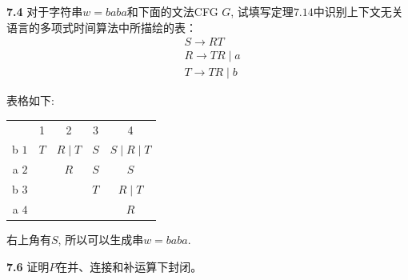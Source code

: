\documentclass[UTF8]{report}
\newcommand{\problem}[1]{{\setlength{\parskip}{10pt}\noindent \bf{#1}}}
\newenvironment{solution}{{\noindent\hskip 2em \bf 解 \quad}}{}
\begin{document}
\problem{7.4} 对于字符串$w=baba $和下面的文法CFG $G$, 试填写定理$7.14$中识别上下文无关语言的多项式时间算法中所描绘的表：
\begin{align*}
    &S \to RT        \\
    &R \to TR \mid a \\
    &T \to TR \mid b
\end{align*}

\begin{solution}
    表格如下:
    \begin{table}[htbp]
        \centering
        \begin{tabular}{r|c|c|c|c|}
        \multicolumn{1}{r}{} & \multicolumn{1}{c}{1} & \multicolumn{1}{c}{2} & \multicolumn{1}{c}{3} & \multicolumn{1}{c}{4} \bigstrut[b]\\
        \cline{2-5} b $1$ & $T$ & $R\mid T$ & $S$ & $S\mid R\mid T$ \bigstrut\\
        \cline{2-5} a $2$ &     & $R$     & $S$   & $S$ \bigstrut\\
        \cline{2-5} b $3$ &     &         & $T$   & $R\mid T$ \bigstrut\\
        \cline{2-5} a $4$ &     &         &       & $R$ \bigstrut\\
        \cline{2-5}
        \end{tabular}%
    \end{table}%
    右上角有$S$, 所以可以生成串$w=baba$.
\end{solution}

\problem{7.6} 证明$P $在并、连接和补运算下封闭。
\end{document}
